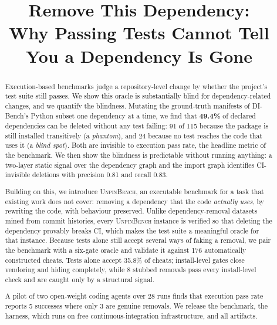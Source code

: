 \documentclass[10pt,conference]{IEEEtran}
\newcommand{\bench}{\textsc{UnpinBench}}
\newcommand{\dibench}{DI-Bench}
\begin{document}
\title{Remove This Dependency:\\
Why Passing Tests Cannot Tell You a Dependency Is Gone}

\author{
}

\maketitle

\begin{abstract}
Execution-based benchmarks judge a repository-level change by whether the
project's test suite still passes. We show this oracle is substantially
blind for dependency-related changes, and we quantify the blindness.
Mutating the ground-truth manifests of \dibench's Python subset one
dependency at a time, we find that \textbf{49.4\%} of declared
dependencies can be deleted without any test failing: 91 of 115 because
the package is still installed transitively (a \emph{phantom}), and 24
because no test reaches the code that uses it (a \emph{blind spot}).
Both are invisible to execution pass rate, the headline metric of the
benchmark. We then show the blindness is predictable without running
anything: a two-layer static signal over the dependency graph and the
import graph identifies CI-invisible deletions with precision 0.81 and
recall 0.83.

Building on this, we introduce \bench, an executable benchmark for a task
that existing work does not cover: removing a dependency that the code
\emph{actually uses}, by rewriting the code, with behaviour preserved.
Unlike dependency-removal datasets mined from commit histories, every
\bench{} instance is verified so that deleting the dependency provably
breaks CI, which makes the test suite a meaningful oracle for that
instance. Because tests alone still accept several ways of faking a
removal, we pair the benchmark with a six-gate oracle and validate it
against 176 automatically constructed cheats. Tests alone accept 35.8\%
of cheats; install-level gates close vendoring and hiding completely,
while 8 stubbed removals pass every install-level check and are caught
only by a structural signal.

A pilot of two open-weight coding agents over 28 runs finds that
execution pass rate reports 5 successes where only 3 are genuine
removals. We release the benchmark, the harness, which runs on free
continuous-integration infrastructure, and all artifacts.
\end{abstract}
\end{document}
